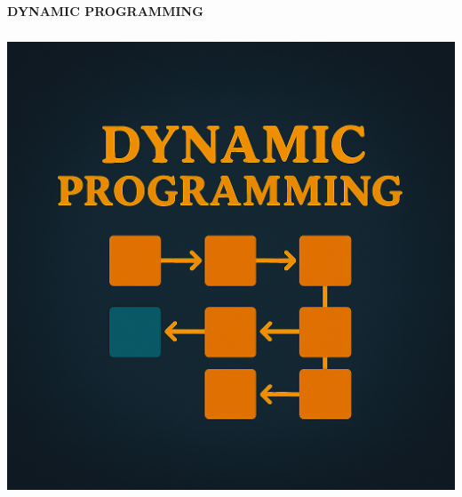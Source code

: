 \documentclass[a4paper,10pt]{book}
\begin{document}
\clearpage
{}

\vspace*{47mm}

\begin{center}

{\fontsize{45}{20}\selectfont \textcolor{headingcolor}{\bfseries DYNAMIC PROGRAMMING}}
\end{center}

\vspace{50mm}

\begin{center}
\includegraphics[height=13.88cm, width=17cm, keepaspectratio]{Pics/dp.png}
\end{center}
\end{document}
